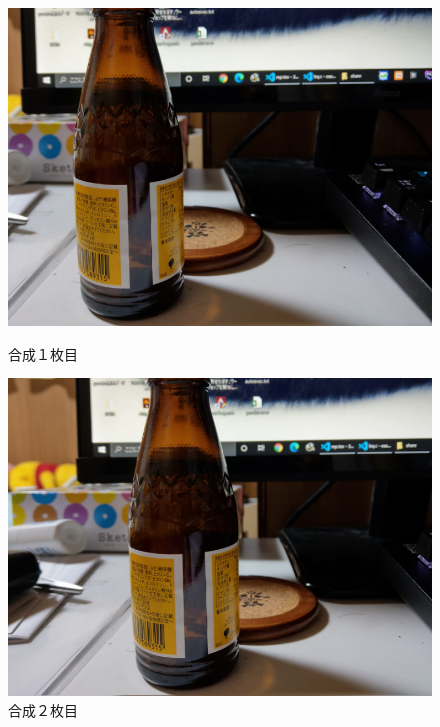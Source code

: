 \documentclass[11pt]{jarticle}
\begin{document}
\begin{figure}[ht]
  \begin{minipage}{0.5\hsize}
    \centering
    \includegraphics[scale=.3]{mae.jpg}
    \caption{合成１枚目}
    \label{itimaime}
  \end{minipage}
  \begin{minipage}{0.5\hsize}
    \centering
    \includegraphics[scale=.3]{ato.jpg}
    \caption{合成２枚目}
    \label{nimaime}
  \end{minipage}
\end{figure}
\end{document}
